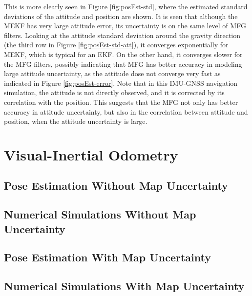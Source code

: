 This is more clearly seen in Figure \ref{fig:posEst-std}, where the estimated standard deviations of the attitude and position are shown.
It is seen that although the MEKF has very large attitude error, its uncertainty is on the same level of MFG filters.
Looking at the attitude standard deviation around the gravity direction (the third row in Figure \ref{fig:posEst-std-att}), it converges exponentially for MEKF, which is typical for an EKF.
On the other hand, it converges slower for the MFG filters, possibly indicating that MFG has better accuracy in modeling large attitude uncertainty, as the attitude dose not converge very fast as indicated in Figure \ref{fig:posEst-error}.
Note that in this IMU-GNSS navigation simulation, the attitude is not directly observed, and it is corrected by its correlation with the position.
This suggests that the MFG not only has better accuracy in attitude uncertainty, but also in the correlation between attitude and position, when the attitude uncertainty is large.

\section{Visual-Inertial Odometry}

\subsection{Pose Estimation Without Map Uncertainty}

\subsection{Numerical Simulations Without Map Uncertainty}

\subsection{Pose Estimation With Map Uncertainty}

\subsection{Numerical Simulations With Map Uncertainty}

